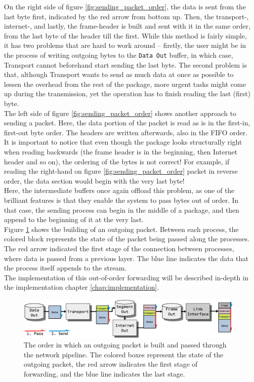 On the right side of figure \ref{fig:sending_packet_order}, the data is sent
from the last byte first, indicated by the red arrow from bottom up. Then, the
transport-, internet-, and lastly, the frame-header is built and sent with it
in the same order, from the last byte of the header till the first.
While this method is fairly simple, it has two problems that are hard to work
around -- firstly, the user might be in the process of writing outgoing bytes
to the \texttt{Data Out} buffer, in which case, Transport cannot beforehand
start sending the last byte. The second problem is that, although Transport
wants to send as much data at once as possible to lessen the overhead from the
rest of the package, more urgent tasks might come up during the transmission,
yet the operation has to finish reading the last (first) byte.\\
The left side of figure \ref{fig:sending_packet_order} shows another approach
to sending a packet. Here, the data portion of the packet is read as is in the
first-in, first-out byte order. The headers are written afterwards, also in the
FIFO order. It is important to notice that even though the package looks
structurally right when reading backwards (the frame header is in the beginning,
then Internet header and so on), the ordering of the bytes is not correct! For
example, if reading the right-hand on figure \ref{fig:sending_packet_order}
packet in reverse order, the data section would begin with the very last byte!\\
Here, the intermediate buffers once again offload this problem, as one of the
brilliant features is that they enable the system to pass bytes out of order.
In that case, the sending process can begin in the middle of a package, and then
append to the beginning of it at the very last.\\
Figure \ref{fig:sending_packet_graph} shows the building of an outgoing packet.
Between each process, the colored block represents the state of the packet
being passed along the processes. The red arrow indicated the first stage of
the connection between processes, where data is passed from a previous layer.
The blue line indicates the data that the process itself appends to the stream.\\
The implementation of this out-of-order forwarding will be described in-depth
in the implementation chapter \ref{chap:implementation}.

\begin{figure}
    \centering
    \includegraphics[scale=0.45]{design/sending_packet_graph.eps}
    \caption{The order in which an outgoing packet is built and passed through the network pipeline.
    The colored boxes represent the state of the outgoing packet, the red arrow
    indicates the first stage of forwarding, and the blue line indicates the last stage.}
    \label{fig:sending_packet_graph}
\end{figure}



